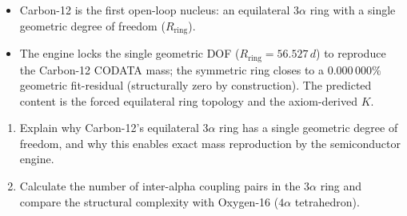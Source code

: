 \begin{summarybox}
\begin{itemize}
    \item Carbon-12 is the first open-loop nucleus: an equilateral $3\alpha$ ring with a single geometric degree of freedom ($R_{\text{ring}}$).
    \item The engine locks the single geometric DOF ($R_{\text{ring}} = 56.527\,d$) to reproduce the Carbon-12 CODATA mass; the symmetric ring closes to a $0.000\,000\%$ geometric fit-residual (structurally zero by construction). The predicted content is the forced equilateral ring topology and the axiom-derived $K$.
\end{itemize}
\end{summarybox}

\begin{exercisebox}
\begin{enumerate}
    \item Explain why Carbon-12's equilateral $3\alpha$ ring has a single geometric degree of freedom, and why this enables exact mass reproduction by the semiconductor engine.
    \item Calculate the number of inter-alpha coupling pairs in the $3\alpha$ ring and compare the structural complexity with Oxygen-16 ($4\alpha$ tetrahedron).
\end{enumerate}
\end{exercisebox}


